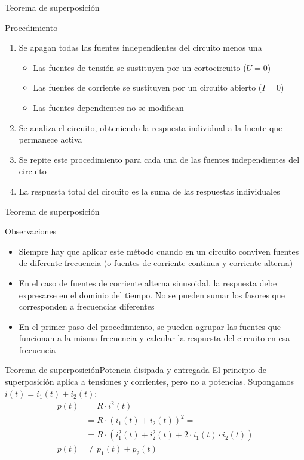 \documentclass[aspectratio=169, xcolor={usenames,svgnames,dvipsnames}]{beamer}
\begin{document}
\begin{frame}{Teorema de superposición}
\begin{block}{Procedimiento}
\begin{enumerate}
\item Se apagan todas las fuentes \alert{independientes} del circuito menos una
\begin{itemize}
\item Las fuentes de tensión se sustituyen por un cortocircuito (\(U = 0\))
\item Las fuentes de corriente se sustituyen por un circuito abierto (\(I = 0\))
\item Las fuentes \alert{dependientes} \alert{no} se modifican
\end{itemize}
\item Se analiza el circuito, obteniendo la respuesta individual a la fuente que permanece activa
\item Se repite este procedimiento para cada una de las fuentes \alert{independientes} del circuito
\item La respuesta total del circuito es la suma de las respuestas individuales
\end{enumerate}
\end{block}
\end{frame}

\begin{frame}{Teorema de superposición}
\begin{block}{Observaciones}
\begin{itemize}
\item \alert{Siempre} hay que aplicar este método cuando en un circuito conviven fuentes de \alert{diferente frecuencia} (o fuentes de corriente continua y corriente alterna)
\item En el caso de fuentes de corriente alterna \alert{sinusoidal}, la respuesta debe expresarse en el \alert{dominio del tiempo}. \alert{No} se pueden \alert{sumar} los \alert{fasores} que corresponden a \alert{frecuencias diferentes}
\item En el primer paso del procedimiento, se pueden agrupar las fuentes que funcionan a la misma frecuencia y calcular la respuesta del circuito en esa frecuencia
\end{itemize}
\end{block}
\end{frame}

\begin{frame}{Teorema de superposición}{Potencia disipada y entregada}
El principio de superposición aplica a tensiones y corrientes, pero \alert{no} a potencias. Supongamos \(i(t) = i_1(t) + i_2(t)\):
\begin{align*}
  p(t) &= R \cdot i^2(t) =\\
       &= R \cdot (i_1(t) + i_2(t))^2 =\\
       &=R \cdot (i_1^2(t) + i_2^2(t) + 2\cdot i_1(t) \cdot i_2(t))\\
  p(t) &\neq p_1(t) + p_2(t)
\end{align*}
\end{frame}
\end{document}
